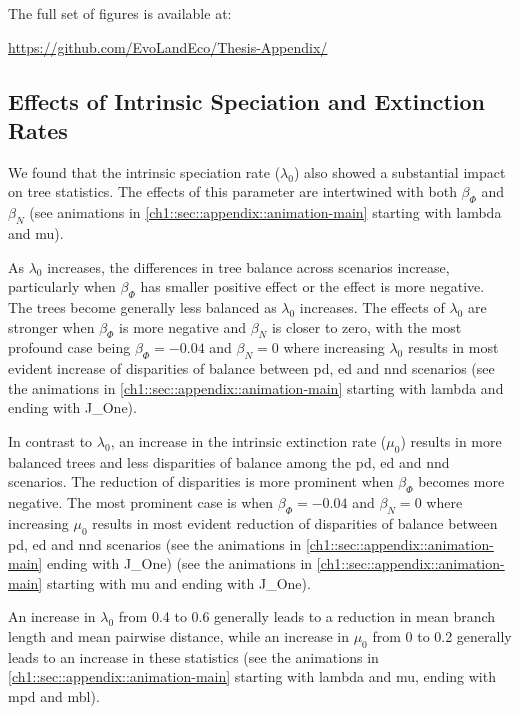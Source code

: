 {The full set of figures is available at: 

\url{https://github.com/EvoLandEco/Thesis-Appendix/}

\clearpage
\subsection{Effects of Intrinsic Speciation and Extinction Rates}
\label{ch1::sec::appendix::effect-lambda-mu}
We found that the intrinsic speciation rate ($\lambda_0$) also showed a substantial impact on tree statistics. The effects of this parameter are intertwined with both $\beta_\varPhi$ and $\beta_N$ (see animations in \autoref{ch1::sec::appendix::animation-main} starting with lambda and mu).

As $\lambda_0$ increases, the differences in tree balance across scenarios increase, particularly when $\beta_\varPhi$ has smaller positive effect or the effect is more negative. The trees become generally less balanced as $\lambda_0$ increases. The effects of $\lambda_0$ are stronger when $\beta_\varPhi$ is more negative and $\beta_N$ is closer to zero, with the most profound case being $\beta_\varPhi=-0.04$ and $\beta_N=0$ where increasing $\lambda_0$ results in most evident increase of disparities of balance between \acrshort{pd}, \acrshort{ed} and \acrshort{nnd} scenarios (see the animations in \autoref{ch1::sec::appendix::animation-main} starting with lambda and ending with J\_One). 

In contrast to $\lambda_0$, an increase in the intrinsic extinction rate ($\mu_0$) results in more balanced trees and less disparities of balance among the \acrshort{pd}, \acrshort{ed} and \acrshort{nnd} scenarios. The reduction of disparities is more prominent when $\beta_\varPhi$ becomes more negative. The most prominent case is when $\beta_\varPhi=-0.04$ and $\beta_N=0$ where increasing $\mu_0$ results in most evident reduction of disparities of balance between \acrshort{pd}, \acrshort{ed} and \acrshort{nnd} scenarios (see the animations in \autoref{ch1::sec::appendix::animation-main} ending with J\_One) (see the animations in \autoref{ch1::sec::appendix::animation-main} starting with mu and ending with J\_One).

An increase in $\lambda_0$ from 0.4 to 0.6 generally leads to a reduction in mean branch length and mean pairwise distance, while an increase in $\mu_0$ from 0 to 0.2 generally leads to an increase in these statistics (see the animations in \autoref{ch1::sec::appendix::animation-main} starting with lambda and mu, ending with \acrshort{mpd} and \acrshort{mbl}).

}
